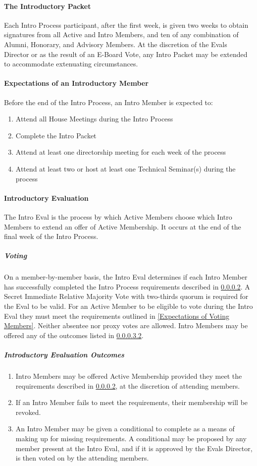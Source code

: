 \documentclass{article}
\newcommand{\asubsubsection}[1]{\paragraph{#1} \label{#1}}
\newcommand{\asubsubsubsection}[1]{\subparagraph{#1} \label{#1}}
\begin{document}
\asubsubsection{The Introductory Packet}
Each Intro Process participant, after the first week, is given two weeks to obtain signatures from all Active and Intro Members, and ten of any combination of Alumni, Honorary, and Advisory Members.
At the discretion of the Evals Director or as the result of an E-Board Vote, any Intro Packet may be extended to accommodate extenuating circumstances.

\asubsubsection{Expectations of an Introductory Member}
\renewcommand{\theenumi}{\arabic{enumi}} %
Before the end of the Intro Process, an Intro Member is expected to:
\begin{enumerate}
	\item Attend all House Meetings during the Intro Process
	\item Complete the Intro Packet
	\item Attend at least one directorship meeting for each week of the process
	\item Attend at least two or host at least one Technical Seminar(s) during the process
\end{enumerate}

\asubsubsection{Introductory Evaluation}
The Intro Eval is the process by which Active Members choose which Intro Members to extend an offer of Active Membership.
It occurs at the end of the final week of the Intro Process.

\asubsubsubsection{Voting}
On a member-by-member basis, the Intro Eval determines if each Intro Member has successfully completed the Intro Process requirements described in \ref{Expectations of an Introductory Member}.
A Secret Immediate Relative Majority Vote with two-thirds quorum is required for the Eval to be valid.
For an Active Member to be eligible to vote during the Intro Eval they must meet the requirements outlined in \ref{Expectations of Voting Members}.
Neither absentee nor proxy votes are allowed.
Intro Members may be offered any of the outcomes listed in \ref{Introductory Evaluation Outcomes}.

\asubsubsubsection{Introductory Evaluation Outcomes}
\renewcommand{\theenumi}{\alph{enumi}} %
\begin{enumerate}
	\item Intro Members may be offered Active Membership provided they meet the requirements described in \ref{Expectations of an Introductory Member}, at the discretion of attending members.
	\item If an Intro Member fails to meet the requirements, their membership will be revoked.
	\item An Intro Member may be given a conditional to complete as a means of making up for missing requirements.
	      A conditional may be proposed by any member present at the Intro Eval, and if it is approved by the Evals Director, is then voted on by the attending members.
\end{enumerate}
\end{document}
